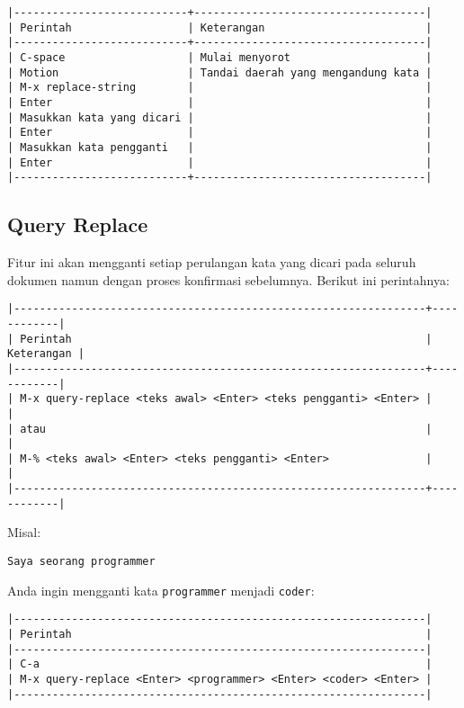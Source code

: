 \documentclass{article}
\begin{document}
\begin{verbatim}
|---------------------------+------------------------------------|
| Perintah                  | Keterangan                         |
|---------------------------+------------------------------------|
| C-space                   | Mulai menyorot                     |
| Motion                    | Tandai daerah yang mengandung kata |
| M-x replace-string        |                                    |
| Enter                     |                                    |
| Masukkan kata yang dicari |                                    |
| Enter                     |                                    |
| Masukkan kata pengganti   |                                    |
| Enter                     |                                    |
|---------------------------+------------------------------------|
\end{verbatim}

\subsection{Query Replace}
Fitur ini akan mengganti setiap perulangan kata yang dicari pada seluruh dokumen
namun dengan proses konfirmasi sebelumnya. Berikut ini perintahnya:

\begin{verbatim}
|----------------------------------------------------------------+------------|
| Perintah                                                       | Keterangan |
|----------------------------------------------------------------+------------|
| M-x query-replace <teks awal> <Enter> <teks pengganti> <Enter> |            |
| atau                                                           |            |
| M-% <teks awal> <Enter> <teks pengganti> <Enter>               |            |
|----------------------------------------------------------------+------------|
\end{verbatim}

Misal:

\begin{verbatim}
Saya seorang programmer
\end{verbatim}

Anda ingin mengganti kata \verb=programmer= menjadi \verb=coder=:

\begin{verbatim}
|----------------------------------------------------------------|
| Perintah                                                       |
|----------------------------------------------------------------|
| C-a                                                            |
| M-x query-replace <Enter> <programmer> <Enter> <coder> <Enter> |
|----------------------------------------------------------------|
\end{verbatim}
\end{document}
